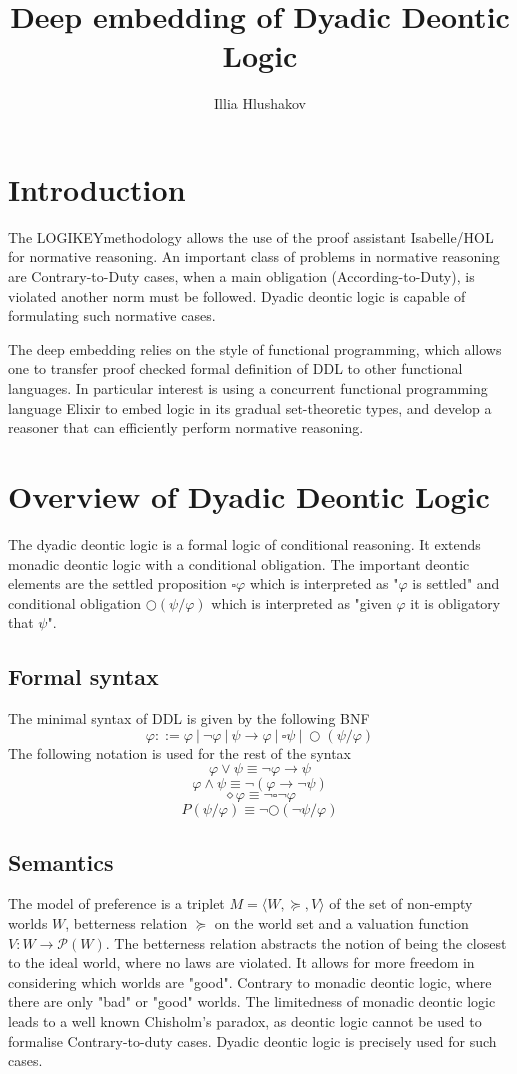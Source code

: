 \documentclass[sigconf,11pt]{acmart}
\title{Deep embedding of Dyadic Deontic Logic}
\author{Illia Hlushakov}
\date{}
\newcommand{\logikey}{L{\scriptsize OGI}KE{\scriptsize Y}}
\begin{document}
\maketitle
\section{Introduction}
The \logikey methodology allows the use of the proof assistant Isabelle/HOL for normative reasoning. An important class of problems in normative reasoning are Contrary-to-Duty cases, when a main obligation (According-to-Duty), is violated another norm must be followed. Dyadic deontic logic is capable of formulating such normative cases. 

The deep embedding relies on the style of functional programming, which allows one to transfer proof checked formal definition of DDL to other functional languages. In particular interest is using a concurrent functional programming language Elixir to embed logic in its gradual set-theoretic types, and develop a reasoner that can efficiently perform normative reasoning.

\section{Overview of Dyadic Deontic Logic}
The dyadic deontic logic is a formal logic of conditional reasoning. It extends monadic deontic logic with a conditional obligation. The important deontic elements are the settled proposition $\square \varphi$ which is interpreted as "$\varphi$ is settled" and conditional obligation $\bigcirc(\psi/ \varphi)$ which is interpreted as "given $\varphi$ it is obligatory that $\psi$". 
\subsection{Formal syntax}
The minimal syntax of DDL is given by the following BNF
	$$\varphi ::= \varphi\ |\ \neg\varphi\ |\ \psi \to \varphi\ |\ \square \psi\ |\ \bigcirc(\psi/\varphi)$$
The following notation is used for the rest of the syntax
$$\varphi\lor\psi \equiv \neg\varphi \to \psi$$
$$\varphi\land\psi \equiv \neg(\varphi \to \neg\psi)$$
$$\diamond\varphi \equiv \neg\square\neg\varphi$$
$$P(\psi/\varphi) \equiv \neg\bigcirc(\neg\psi/\varphi)$$
\subsection{Semantics}
	The model of preference is a triplet $M = \langle W,\succeq, V\rangle$ of the set of non-empty worlds $W$, betterness relation $\succeq$ on the world set and a valuation function $V: W \to \mathcal{P}(W)$. The betterness relation abstracts the notion of being the closest to the ideal world, where no laws are violated. It allows for more freedom in considering which worlds are "good". Contrary to monadic deontic logic, where there are only "bad" or "good" worlds. The limitedness of monadic deontic logic leads to a well known Chisholm's paradox, as deontic logic cannot be used to formalise Contrary-to-duty cases. Dyadic deontic logic is precisely used for such cases.
\end{document}
